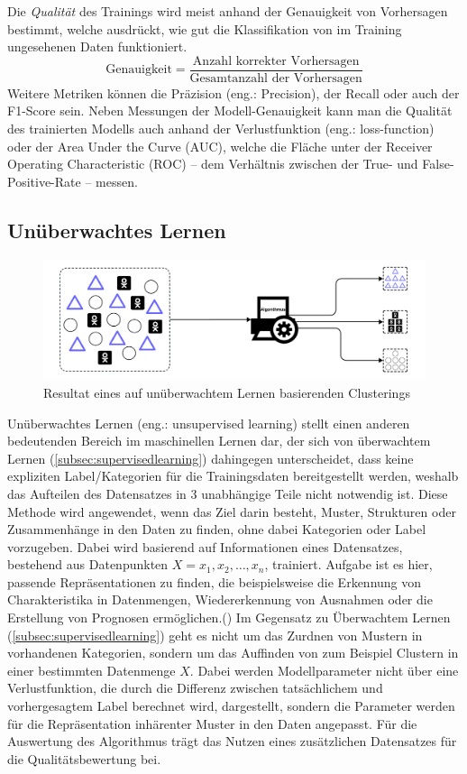 Die \textit{Qualität} des Trainings wird meist anhand der Genauigkeit von Vorhersagen bestimmt, welche ausdrückt, wie gut die Klassifikation von im Training ungesehenen Daten funktioniert.
\begin{equation}
\text{Genauigkeit} = \frac{\text{Anzahl korrekter Vorhersagen}}{\text{Gesamtanzahl der Vorhersagen}}
\end{equation}
 Weitere Metriken können die Präzision (eng.: Precision), der Recall oder auch der F1-Score sein. Neben Messungen der Modell-Genauigkeit kann man die Qualität des trainierten Modells auch anhand der Verlustfunktion (eng.: loss-function) oder der \glqq Area Under the Curve\grqq{} (AUC), welche die Fläche unter der \glqq Receiver Operating Characteristic\grqq{} (ROC) -- dem Verhältnis zwischen der True- und False-Positive-Rate -- messen.
\subsection{Unüberwachtes Lernen}\label{subsec:unsupervisedlearning}
\begin{figure}[H]
	\centering
	\includegraphics[width=0.8\linewidth]{Bilder/unsupervised_sample.png}
	\caption{Resultat eines auf unüberwachtem Lernen basierenden Clusterings}
\end{figure}
Unüberwachtes Lernen (eng.: unsupervised learning) stellt einen anderen bedeutenden Bereich im maschinellen Lernen dar, der sich von überwachtem Lernen (\ref{subsec:supervisedlearning}) dahingegen unterscheidet, dass keine expliziten Label/Kategorien für die Trainingsdaten bereitgestellt werden, weshalb das Aufteilen des Datensatzes in 3 unabhängige Teile nicht notwendig ist. Diese Methode wird angewendet, wenn das Ziel darin besteht, Muster, Strukturen oder Zusammenhänge in den Daten zu finden, ohne dabei Kategorien oder Label vorzugeben. Dabei wird basierend auf Informationen eines Datensatzes, bestehend aus Datenpunkten \textit{$X = x_1, x_2, \ldots, x_n$}, trainiert. \glqq Aufgabe ist es hier, passende Repräsentationen zu finden, die beispielsweise die Erkennung von Charakteristika in Datenmengen, Wiedererkennung von Ausnahmen oder die Erstellung von Prognosen ermöglichen.\grqq (\cite[5]{lorenz_reinforcement_2020}) Im Gegensatz zu Überwachtem Lernen (\ref{subsec:supervisedlearning}) geht es nicht um das Zurdnen von Mustern in vorhandenen Kategorien, sondern um das Auffinden von zum Beispiel Clustern in einer bestimmten Datenmenge $X$. Dabei werden Modellparameter nicht über eine Verlustfunktion, die durch die Differenz zwischen tatsächlichem und vorhergesagtem Label berechnet wird, dargestellt, sondern die Parameter werden für die Repräsentation inhärenter Muster in den Daten angepasst. Für die Auswertung des Algorithmus trägt das Nutzen eines zusätzlichen Datensatzes für die Qualitätsbewertung bei.
